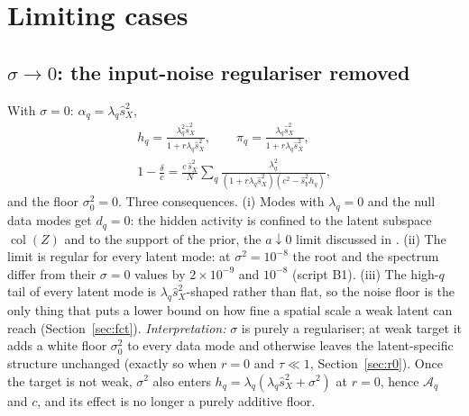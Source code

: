 \documentclass[11pt,a4paper]{article}
\newcommand{\col}{\operatorname{col}}
\newcommand{\sX}{\hat s_X^2}
\newcommand{\sY}{\hat s_Y^2}
\newcommand{\amp}{\mathcal A}
\theoremstyle{remark}
\begin{document}
\section{Limiting cases}
\label{sec:limits}

\subsection{\texorpdfstring{$\sigma\to0$}{sigma -> 0}: the input-noise regulariser removed}
\label{sec:sigma0}
With $\sigma = 0$: $\alpha_q = \lambda_q\sX$,
\begin{equation}
\begin{gathered}
  h_q = \frac{\lambda_q^2\sX}{1 + r\lambda_q\sX},\qquad
  \pi_q = \frac{\lambda_q\sX}{1 + r\lambda_q\sX},\\
  1 - \frac\delta c = \frac{c\,\sX}{N}\sum_q\frac{\lambda_q^2}{(1 + r\lambda_q\sX)(c^2 - \sY h_q)} ,
\end{gathered}
\end{equation}
and the floor $\sigma_0^2 = 0$. Three consequences. (i) Modes with $\lambda_q = 0$ and the null data modes get $d_q = 0$: the hidden activity is confined to the latent subspace $\col(Z)$ and to the support of the prior, the $a\downarrow0$ limit discussed in . (ii) The limit is regular for every latent mode: at $\sigma^2 = 10^{-8}$ the root and the spectrum differ from their $\sigma = 0$ values by $2\times10^{-9}$ and $10^{-8}$ (script B1). (iii) The high-$q$ tail of every latent mode is $\lambda_q\sX$-shaped rather than flat, so the noise floor is the only thing that puts a lower bound on how fine a spatial scale a weak latent can reach (Section~\ref{sec:fct}).
\emph{Interpretation:} $\sigma$ is purely a regulariser; at weak target it adds a white floor $\sigma_0^2$ to every data mode and otherwise leaves the latent-specific structure unchanged (exactly so when $r = 0$ and $\tau\ll1$, Section~\ref{sec:r0}). Once the target is not weak, $\sigma^2$ also enters $h_q = \lambda_q(\lambda_q\sX + \sigma^2)$ at $r = 0$, hence $\amp_q$ and $c$, and its effect is no longer a purely additive floor.
\end{document}
